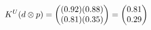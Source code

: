 \documentclass[preview]{standalone}
\begin{document}
\begin{align*}
\special{dvisvgm:raw <g id='unique000'>}K^U(d \otimes p) = \begin{pmatrix} (0.92)(0.88) \\ (0.81)(0.35) \end{pmatrix} = \begin{pmatrix} 0.81 \\ 0.29 \end{pmatrix}\special{dvisvgm:raw </g>}
\end{align*}
\end{document}
